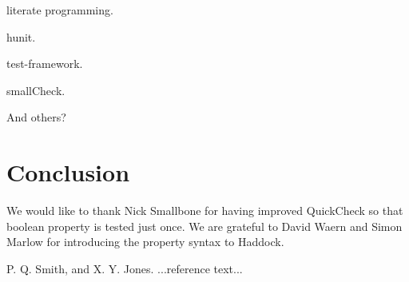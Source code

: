 \documentclass[preprint]{sigplanconf}
\begin{document}
literate programming.

hunit.

test-framework.

smallCheck.

And others?

\section{Conclusion}



\acks

We would like to thank
Nick Smallbone for having improved QuickCheck so that boolean property is tested
just once.
We are grateful to David Waern and Simon Marlow
for introducing the property syntax to Haddock.






\begin{thebibliography}{}
\softraggedright

P. Q. Smith, and X. Y. Jones. ...reference text...

\end{thebibliography}
\end{document}
